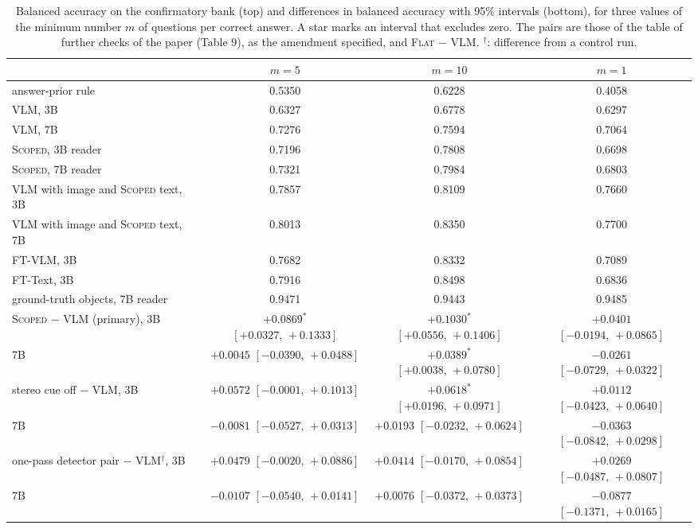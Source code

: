 \documentclass[10pt]{article}
\renewcommand{\thetable}{S\arabic{table}}
\newcommand{\settab}[1]{\setcounter{table}{#1}\addtocounter{table}{-1}\renewcommand{\thetable}{S\arabic{table}}}
\begin{document}
\settab{12}\begin{table}[h]\centering\footnotesize
\caption{Balanced accuracy on the confirmatory bank (top) and differences in balanced accuracy with 95\% intervals (bottom), for three values of the minimum number $m$ of questions per correct answer. A star marks an interval that excludes zero. The pairs are those of the table of further checks of the paper (Table 9), as the amendment specified, and \textsc{Flat} $-$ VLM. $^{\dagger}$: difference from a control run.}\label{tab:s12}
\setlength{\tabcolsep}{3.5pt}\begin{tabular}{@{}lccc@{}}
\toprule & $m=5$ & $m=10$ & $m=1$ \\ \midrule
answer-prior rule & 0.5350 & 0.6228 & 0.4058 \\
VLM, 3B & 0.6327 & 0.6778 & 0.6297 \\
VLM, 7B & 0.7276 & 0.7594 & 0.7064 \\
\textsc{Scoped}, 3B reader & 0.7196 & 0.7808 & 0.6698 \\
\textsc{Scoped}, 7B reader & 0.7321 & 0.7984 & 0.6803 \\
VLM with image and \textsc{Scoped} text, 3B & 0.7857 & 0.8109 & 0.7660 \\
VLM with image and \textsc{Scoped} text, 7B & 0.8013 & 0.8350 & 0.7700 \\
FT-VLM, 3B & 0.7682 & 0.8332 & 0.7089 \\
FT-Text, 3B & 0.7916 & 0.8498 & 0.6836 \\
ground-truth objects, 7B reader & 0.9471 & 0.9443 & 0.9485 \\ \midrule
\textsc{Scoped} $-$ VLM (primary), 3B & $+0.0869^{*}$ $[+0.0327,\,+0.1333]$ & $+0.1030^{*}$ $[+0.0556,\,+0.1406]$ & $+0.0401$ $[-0.0194,\,+0.0865]$ \\
7B & $+0.0045$ $[-0.0390,\,+0.0488]$ & $+0.0389^{*}$ $[+0.0038,\,+0.0780]$ & $-0.0261$ $[-0.0729,\,+0.0322]$ \\
stereo cue off $-$ VLM, 3B & $+0.0572$ $[-0.0001,\,+0.1013]$ & $+0.0618^{*}$ $[+0.0196,\,+0.0971]$ & $+0.0112$ $[-0.0423,\,+0.0640]$ \\
7B & $-0.0081$ $[-0.0527,\,+0.0313]$ & $+0.0193$ $[-0.0232,\,+0.0624]$ & $-0.0363$ $[-0.0842,\,+0.0298]$ \\
one-pass detector pair $-$ VLM$^{\dagger}$, 3B & $+0.0479$ $[-0.0020,\,+0.0886]$ & $+0.0414$ $[-0.0170,\,+0.0854]$ & $+0.0269$ $[-0.0487,\,+0.0807]$ \\
7B & $-0.0107$ $[-0.0540,\,+0.0141]$ & $+0.0076$ $[-0.0372,\,+0.0373]$ & $-0.0877$ $[-0.1371,\,+0.0165]$ \\

\end{tabular}
\end{table}
\end{document}
